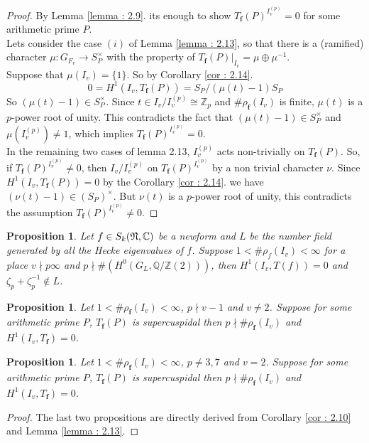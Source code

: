 \documentclass[10pt]{amsart}
\numberwithin{equation}{section}
\newtheorem{prop}[thm]{Proposition}
\theoremstyle{definition}
\theoremstyle{remark} %
\newcommand{\f}{\mathbf{f}}
\newcommand{\Q}{\mathbb{Q}}
\newcommand{\Z}{\mathbb{Z}}
\begin{document}
	\begin{proof}
		By Lemma \ref{lemma : 2.9}. its enough to show $ T_\f(P)^{I_v^{(p)}}= 0 $ for some arithmetic prime $P$. \\
		Lets consider the case $ (i) $ of Lemma \ref{lemma : 2.13}, so that there is a (ramiﬁed) character $ \mu \colon G_{F_v} \rightarrow S_{P}^{\times} $ with the property of $T_\f(P)|_{I_v} =  \mu \oplus \mu^{-1}$.\\
		Suppose that $ \mu(I_v)= \{1\} $. So by Corollary \ref{cor : 2.14}. 
		$$ 0 = H^1(I_v, T_\f(P)) = S_{P}/(\mu(t)-1)S_{P} $$
		So $ (\mu(t)-1) \in S_{P}^{\times} $. Since $ t \in I_{v}/I_{v}^{(p)} \cong \Z_p $ and $\#\rho_{\f}(I_{v})$ is finite, $ \mu(t) $ is a $p$-power root of unity. This contradicts the fact that $ (\mu(t)-1) \in S_{P}^{\times} $ and $ \mu(I_{v}^{(p)}) \ne 1 $, which implies $ T_\f(P)^{I_v^{(p)}}= 0 $. \\
		In the remaining two cases of lemma 2.13, $I_v^{(p)}$ acts non-trivially on $T_\f(P)$. So, if $ T_\f(P)^{I_v^{(p)}} \ne 0 $, then $ I_{v}/I_{v}^{(p)} $ on $ T_\f(P)^{I_v^{(p)}} $ by a non trivial character $ \nu $. Since $ H^1(I_v, T_\f(P)) =0 $ by the Corollary \ref{cor : 2.14}. we have $ (\nu(t)-1) \in (S_P)^\times $. But $ \nu(t) $ is a $ p $-power root of unity, this contradicts the assumption $ T_\f(P)^{I_v^{(p)}} \ne 0 $.
	\end{proof}
	\begin{prop}\cite[.10.3]{Nek06}
		Let $ f \in S_k(\frak{N}, \mathbb{C}) $ be a newform and $ L $ be the number field generated by all the Hecke eigenvalues of $ f $. Suppose $ 1< \#\rho_f(I_v)<\infty $ for a place $ v \nmid p\infty $ and $ p\nmid \#( H^0(G_L, \Q/\Z(2)) )$, then $ H^1(I_v,T(f)) =0$ and $ \zeta_p + \zeta_p^{-1} \notin L $.
	\end{prop}
	\begin{prop}
		Let $ 1< \#\rho_{\f}(I_v)<\infty $, $ p\nmid v-1 $ and $ v\ne 2 $. Suppose for some arithmetic prime $ P $, $ T_{\f}(P) $ is supercuspidal then $ p \nmid \#\rho_{\f}(I_v) $ and $ H^1(I_v,T_{\f}) =0 $.
	\end{prop}
	\begin{prop}
		Let $ 1< \#\rho_{\f}(I_v)<\infty $, $ p \ne 3,7 $ and $ v=2 $. Suppose for some arithmetic prime $ P $, $ T_{\f}(P) $ is supercuspidal then $ p \nmid \#\rho_{\f}(I_v) $ and $ H^1(I_v,T_{\f}) =0 $.	
	\end{prop}
	\begin{proof}
		The last two propositions are directly derived from Corollary \ref{cor : 2.10} and Lemma \ref{lemma : 2.13}.
	\end{proof}
\end{document}
